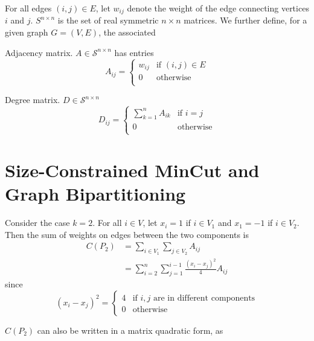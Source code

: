 For all edges $(i,j) \in E$, let $w_{ij}$ denote the weight of the edge
connecting vertices $i$ and $j$.
$S^{n \times n}$ is the set of real symmetric $n \times n$ matrices.
We further define, for a given graph $G = (V, E)$, the associated

\begin{definition}
Adjacency matrix. $A \in \mathcal{S}^{n \times n}$ has entries
\[
A_{ij} = \begin{cases}
  w_{ij} & \text{if } (i,j) \in E \\
  0      & \text{otherwise} \\
\end{cases}
\]
\end{definition}

\begin{definition}
Degree matrix. $D \in \mathcal{S}^{n \times n}$
\[
D_{ij} = \begin{cases}
  \sum_{k = 1}^n A_{ik} & \text{if } i = j \\
  0                     & \text{otherwise} \\
\end{cases}
\]
\end{definition}

\section{Size-Constrained MinCut and Graph Bipartitioning}

Consider the case $k = 2$. For all $i \in V$, let $x_i = 1$ if
$i \in V_1$ and $x_1 = -1$ if $i \in V_2$. Then the sum of weights on
edges between the two components is
\begin{align*}
C(P_2)
&= \sum_{i \in V_1} \sum_{j \in V_2} A_{ij} \\
&= \sum_{i = 2}^n \sum_{j = 1}^{i-1} \frac{(x_i - x_j)^2}{4} A_{ij} 
\end{align*}
since
\[ (x_i - x_j)^2 = \begin{cases}
	4 & \mbox{if } i,j \mbox{ are in different components} \\
	0 & \mbox{otherwise}
\end{cases}\]

$C(P_2)$ can also be written in a matrix quadratic form, as

